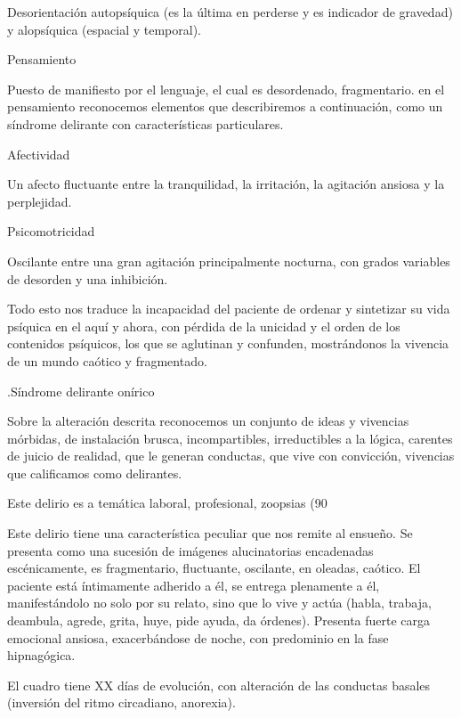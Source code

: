 \documentclass[encares.tex]{subfiles}
\begin{document}
Desorientación autopsíquica (es la última en perderse y es indicador de gravedad) y alopsíquica (espacial y temporal).

Pensamiento

Puesto de manifiesto por el lenguaje, el cual es desordenado, fragmentario. en el pensamiento reconocemos elementos que describiremos a continuación, como un síndrome delirante con características particulares.

Afectividad

Un afecto fluctuante entre la tranquilidad, la irritación, la agitación ansiosa y la perplejidad.

Psicomotricidad

Oscilante entre una gran agitación principalmente nocturna, con grados variables de desorden y una inhibición.

Todo esto nos traduce la incapacidad del paciente de ordenar y sintetizar su vida psíquica en el aquí y ahora, con pérdida de la unicidad y el orden de los contenidos psíquicos, los que se aglutinan y confunden, mostrándonos la vivencia de un mundo caótico y fragmentado.

.Síndrome delirante onírico

Sobre la alteración descrita reconocemos un conjunto de ideas y vivencias mórbidas, de instalación brusca, incompartibles, irreductibles a la lógica, carentes de juicio de realidad, que le generan conductas, que vive con convicción, vivencias que calificamos como delirantes.

Este delirio es a temática laboral, profesional, zoopsias (90%

Este delirio tiene una característica peculiar que nos remite al ensueño. Se presenta como una sucesión de imágenes alucinatorias encadenadas escénicamente, es fragmentario, fluctuante, oscilante, en oleadas, caótico. El paciente está íntimamente adherido a él, se entrega plenamente a él, manifestándolo no solo por su relato, sino que lo vive y actúa (habla, trabaja, deambula, agrede, grita, huye, pide ayuda, da órdenes). Presenta fuerte carga emocional ansiosa, exacerbándose de noche, con predominio en la fase hipnagógica.

El cuadro tiene XX días de evolución, con alteración de las conductas basales (inversión del ritmo circadiano, anorexia).
\end{document}
